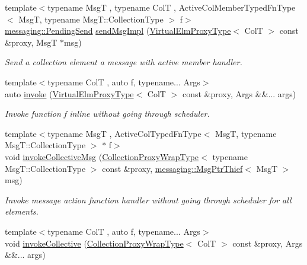 \begin{DoxyCompactItemize}
{\footnotesize template$<$typename MsgT , typename ColT , Active\+Col\+Member\+Typed\+Fn\+Type$<$ Msg\+T, typename Msg\+T\+::\+Collection\+Type $>$ f$>$ }\\\hyperlink{structvt_1_1messaging_1_1_pending_send}{messaging\+::\+Pending\+Send} \hyperlink{structvt_1_1vrt_1_1collection_1_1_collection_manager_afc14691c6992cc5d7e51118b1386b67c}{send\+Msg\+Impl} (\hyperlink{namespacevt_1_1vrt_a620a5c8c59d13e513f690c74b4af516f}{Virtual\+Elm\+Proxy\+Type}$<$ ColT $>$ const \&proxy, MsgT $\ast$msg)
\begin{DoxyCompactList}\small\item\em Send a collection element a message with active member handler. \end{DoxyCompactList}\item 
{\footnotesize template$<$typename ColT , auto f, typename... Args$>$ }\\auto \hyperlink{structvt_1_1vrt_1_1collection_1_1_collection_manager_a2bb9d571a4d12813314264dfe0d5d52f}{invoke} (\hyperlink{namespacevt_1_1vrt_a620a5c8c59d13e513f690c74b4af516f}{Virtual\+Elm\+Proxy\+Type}$<$ ColT $>$ const \&proxy, Args \&\&... args)
\begin{DoxyCompactList}\small\item\em Invoke function \textquotesingle{}f\textquotesingle{} inline without going through scheduler. \end{DoxyCompactList}\item 
{\footnotesize template$<$typename MsgT , Active\+Col\+Typed\+Fn\+Type$<$ Msg\+T, typename Msg\+T\+::\+Collection\+Type $>$ $\ast$ f$>$ }\\void \hyperlink{structvt_1_1vrt_1_1collection_1_1_collection_manager_aecbe91648c89bff4635fbd782ccd458a}{invoke\+Collective\+Msg} (\hyperlink{structvt_1_1vrt_1_1collection_1_1_collection_manager_a56458ed7f9bb22b631b9b3a745f42f94}{Collection\+Proxy\+Wrap\+Type}$<$ typename Msg\+T\+::\+Collection\+Type $>$ const \&proxy, \hyperlink{structvt_1_1messaging_1_1_msg_ptr_thief}{messaging\+::\+Msg\+Ptr\+Thief}$<$ MsgT $>$ msg)
\begin{DoxyCompactList}\small\item\em Invoke message action function handler without going through scheduler for all elements. \end{DoxyCompactList}\item 
{\footnotesize template$<$typename ColT , auto f, typename... Args$>$ }\\void \hyperlink{structvt_1_1vrt_1_1collection_1_1_collection_manager_ab1a88b9d0e53a42df1c897f8d73f8475}{invoke\+Collective} (\hyperlink{structvt_1_1vrt_1_1collection_1_1_collection_manager_a56458ed7f9bb22b631b9b3a745f42f94}{Collection\+Proxy\+Wrap\+Type}$<$ ColT $>$ const \&proxy, Args \&\&... args)

\end{DoxyCompactItemize}
